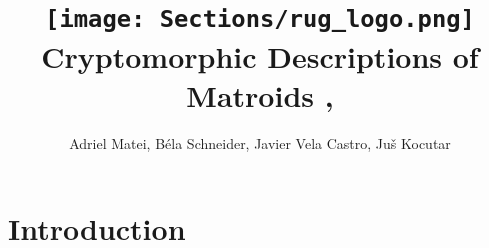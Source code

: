 \documentclass{article}
\title{ {\texttt{[image: Sections/rug\_logo.png]}}\\
    \vspace{2cm}
    {Cryptomorphic Descriptions of Matroids} ,
    }
\author{Adriel Matei, Béla Schneider, Javier Vela Castro, Juš Kocutar}
\theoremstyle{plain}
\theoremstyle{definition}
\theoremstyle{remark}
\numberwithin{equation}{section}
\begin{document}
\maketitle


\newpage

\tableofcontents

\newpage
\section{Introduction}





















\nocite{*} 


\end{document}
